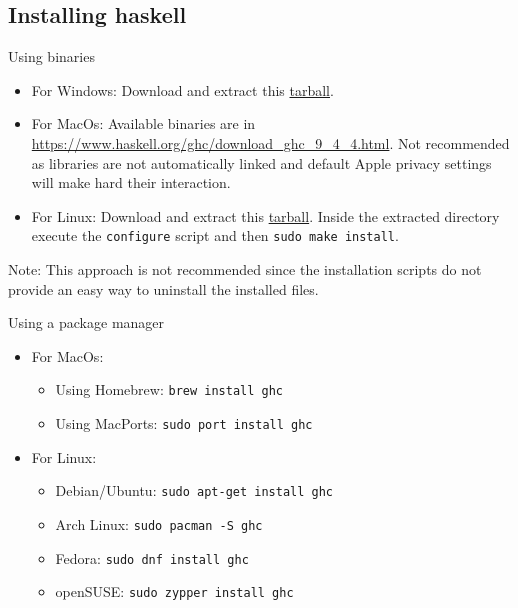 \subsection{Installing haskell}

\begin{frame}[fragile]{Using binaries}

  \begin{itemize}
  \item For Windows: Download and extract
    this
    \href{https://downloads.haskell.org/~ghc/9.2.5/ghc-9.2.5-x86_64-unknown-mingw32-integer-simple.tar.xz}{tarball}.
  \item For MacOs: Available binaries are
    in \url{https://www.haskell.org/ghc/download_ghc_9_4_4.html}. Not
    recommended as libraries are 
    not automatically linked and default Apple privacy settings will make hard
    their interaction. 
  \item For Linux: Download and extract
    this
    \href{https://downloads.haskell.org/~ghc/9.4.4/ghc-9.4.4-x86_64-fedora33-linux.tar.xz}{tarball}. Inside
    the extracted directory execute the \verb|configure| script and then
    \verb|sudo make install|.
  \end{itemize}

Note: This approach is not recommended since the installation scripts do not
provide an easy way to uninstall the installed files.

\end{frame}

\begin{frame}[fragile]{Using a package manager}
  \begin{itemize}
  \item For MacOs:
    \begin{itemize}
    \item Using Homebrew: \verb|brew install ghc|
    \item Using MacPorts: \verb|sudo port install ghc|
    \end{itemize}
  \item For Linux:
    \begin{itemize}
    \item Debian/Ubuntu: \verb|sudo apt-get install ghc|
    \item Arch Linux: \verb|sudo pacman -S ghc|
    \item Fedora: \verb|sudo dnf install ghc|
    \item openSUSE: \verb|sudo zypper install ghc|
    \end{itemize}
  \end{itemize}
\end{frame}